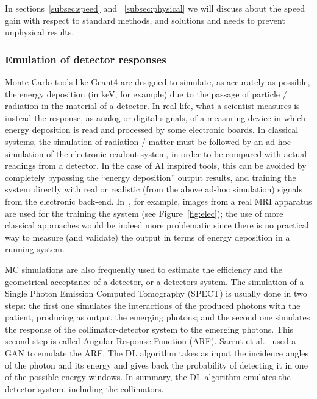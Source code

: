 In sections~\ref{subsec:speed} and ~\ref{subsec:physical} we will discuss about the speed gain with respect to standard methods, and solutions and needs to prevent unphysical results.

\subsubsection{Emulation of detector responses}
Monte Carlo tools like Geant4 are designed to simulate, as accurately as possible, the energy deposition (in keV, for example) due to the passage of particle / radiation in the material of a detector. In real life, what a scientist measures is instead the response, as analog or digital signals, of a measuring device in which energy deposition is read and processed by some electronic boards. In classical systems, the simulation of radiation / matter must be followed by an ad-hoc simulation of the electronic readout system, in order to be compared with actual readings from a detector. In the case of AI inspired tools, this can be avoided by completely bypassing the ``energy deposition'' output results, and training the system directly with real or realistic (from the above ad-hoc simulation) signals from the electronic back-end. In~\cite{mri}, for example, images from a real MRI apparatus are used for the training the system (see Figure~\ref{fig:elec}); the use of more classical approaches would be indeed more problematic since there is no practical way to measure (and validate) the output in terms of energy deposition in a running system.

MC simulations are also frequently used to estimate the efficiency and the geometrical acceptance of a detector, or a detectors system. The simulation of a Single Photon Emission Computed Tomography (SPECT) is usually done in two steps: the first one simulates the interactions of the produced photons with the patient, producing as output the emerging photons; and the second one simulates the response of the collimator-detector system to the emerging photons. This second step is called Angular Response Function (ARF).
Sarrut et al.~\cite{Sarrut2018} used a GAN to emulate the ARF. The DL algorithm takes as input the incidence angles of the photon and its energy and gives back the probability of detecting it in one of the possible energy windows. %
In summary, the DL algorithm emulates the detector system, including the collimators.

